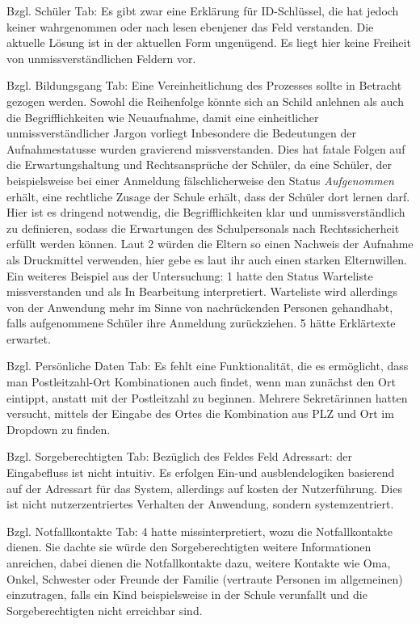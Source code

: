Bzgl. Schüler Tab: Es gibt zwar eine Erklärung für ID-Schlüssel, die hat jedoch keiner wahrgenommen oder nach lesen ebenjener das Feld verstanden. Die aktuelle Lösung ist in der aktuellen Form ungenügend. Es liegt hier keine Freiheit von unmissverständlichen Feldern vor.

Bzgl. Bildungsgang Tab:
Eine Vereinheitlichung des Prozesses sollte in Betracht gezogen werden. Sowohl die Reihenfolge könnte sich an Schild anlehnen als auch die Begrifflichkeiten wie Neuaufnahme, damit eine einheitlicher unmissverständlicher Jargon vorliegt
Inbesondere die Bedeutungen der Aufnahmestatusse wurden gravierend missverstanden. Dies hat fatale Folgen auf die Erwartungshaltung und Rechtsansprüche der Schüler, da eine Schüler, der beispielsweise bei einer Anmeldung fälschlicherweise den Status \textit{Aufgenommen} erhält, eine rechtliche Zusage der Schule erhält, dass der Schüler dort lernen darf. Hier ist es dringend notwendig, die Begrifflichkeiten klar und unmissverständlich zu definieren, sodass die Erwartungen des Schulpersonals nach Rechtssicherheit erfüllt werden können. Laut 2 würden die Eltern so einen Nachweis der Aufnahme als \glqq Druckmittel\grqq{} verwenden, hier gebe es laut ihr auch einen starken Elternwillen.
Ein weiteres Beispiel aus der Untersuchung:  1 hatte den Status Warteliste missverstanden und als \glqq In Bearbeitung\grqq{} interpretiert. Warteliste wird allerdings von der Anwendung mehr im Sinne von nachrückenden Personen gehandhabt, falls aufgenommene Schüler ihre Anmeldung zurückziehen. 5 hätte Erklärtexte erwartet. 

Bzgl. Persönliche Daten Tab:
Es fehlt eine Funktionalität, die es ermöglicht, dass man Postleitzahl-Ort Kombinationen auch findet, wenn man zunächst den Ort eintippt, anstatt mit der Postleitzahl zu beginnen. Mehrere Sekretärinnen hatten versucht, mittels der Eingabe des Ortes die Kombination aus PLZ und Ort im Dropdown zu finden.

Bzgl. Sorgeberechtigten Tab:
Bezüglich des Feldes Feld Adressart: der Eingabefluss ist nicht intuitiv. Es erfolgen Ein-und ausblendelogiken basierend auf der Adressart für das System, allerdings auf kosten der Nutzerführung. Dies ist nicht nutzerzentriertes Verhalten der Anwendung, sondern systemzentriert. 

Bzgl. Notfallkontakte Tab:
4 hatte missinterpretiert, wozu die Notfallkontakte dienen. Sie dachte sie würde den Sorgeberechtigten weitere Informationen anreichen, dabei dienen die Notfallkontakte dazu, weitere Kontakte wie Oma, Onkel, Schwester oder Freunde der Familie (vertraute Personen im allgemeinen) einzutragen, falls ein Kind beispielsweise in der Schule verunfallt und die Sorgeberechtigten nicht erreichbar sind.

